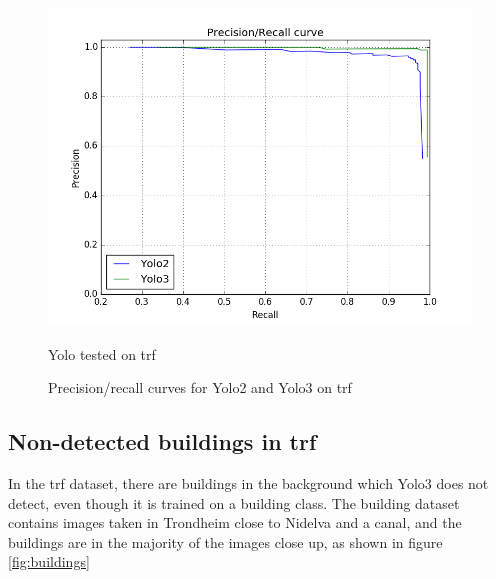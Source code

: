 \begin{figure}[h!]
  \centering
  \includegraphics[width=0.8\linewidth]{results/case_buildings/prec_recall/yolo/trf.png}
  \caption{Yolo tested on trf}
  \label{fig:ex_trf_prec_rec_yolo}
\caption{Precision/recall curves for Yolo2 and Yolo3 on trf}
\label{fig:yolo_trf_prec}
\end{figure}

\newpage

\subsection{Non-detected buildings in trf}
\label{sec:build_trf}
In the trf dataset, there are buildings in the background which Yolo3 does not detect, even though it is trained on a building class. The building dataset contains images taken in Trondheim close to Nidelva and a canal, and the buildings are in the majority of the images close up, as shown in figure \ref{fig:buildings}

